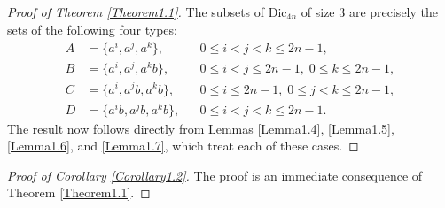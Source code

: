 \documentclass[11pt,reqno]{amsart}
\numberwithin{equation}{section}
\begin{document}
\begin{proof}[Proof of Theorem \ref{Theorem1.1}]
The subsets of $\mathrm{Dic}_{4n}$ of size $3$ are precisely the sets of the following four types:
$$
\begin{aligned}
A&=\{a^i,a^j,a^k\}, && 0\le i<j<k\le 2n-1,\\
B&=\{a^i,a^j,a^kb\}, && 0\le i<j\le 2n-1,\; 0\le k\le 2n-1,\\
C&=\{a^{i},a^jb,a^kb\}, && 0\le i\le 2n-1,\; 0\le j<k\le 2n-1,\\
D&=\{a^ib,a^jb,a^kb\}, && 0\le i<j<k\le 2n-1.
\end{aligned}
$$
The result now follows directly from Lemmas \ref{Lemma1.4}, \ref{Lemma1.5}, \ref{Lemma1.6}, and \ref{Lemma1.7}, which treat each of these cases.
\end{proof}

\begin{proof}[Proof of Corollary \ref{Corollary1.2}]
The proof is an immediate consequence of Theorem \ref{Theorem1.1}.
\end{proof}
\end{document}
